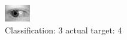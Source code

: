 \begin{figure}[h!]
\begin{center}
\includegraphics[width=0.60\columnwidth]{figures/ID773_class_3_target_4.png}
\end{center}
\caption{ Classification: 3 actual target: 4}
\label{fig:ID773_class_3_target_4}
\end{figure}
